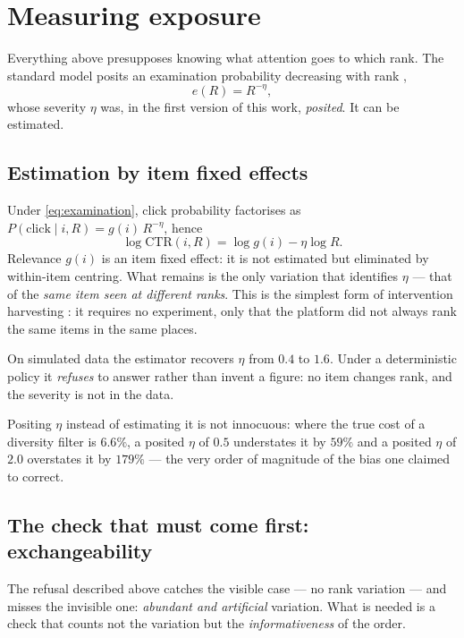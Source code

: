 \documentclass[11pt,a4paper]{article}
\begin{document}
\section{Measuring exposure}
\label{sec:exposure}

Everything above presupposes knowing what attention goes to which rank. The standard model
posits an examination probability decreasing with rank \citep{joachims2017},
\begin{equation}
e(R) = R^{-\eta},
\label{eq:examination}
\end{equation}
whose severity $\eta$ was, in the first version of this work, \emph{posited}. It can be
estimated.

\subsection{Estimation by item fixed effects}

Under \eqref{eq:examination}, click probability factorises as $P(\text{click} \mid i, R) =
g(i)\, R^{-\eta}$, hence
\begin{equation}
\log \mathrm{CTR}(i, R) = \log g(i) - \eta \log R .
\label{eq:fixedeffects}
\end{equation}
Relevance $g(i)$ is an item fixed effect: it is not estimated but eliminated by within-item
centring. What remains is the only variation that identifies $\eta$ --- that of the \emph{same
item seen at different ranks}. This is the simplest form of intervention harvesting
\citep{agarwal2019}: it requires no experiment, only that the platform did not always rank the
same items in the same places.

On simulated data the estimator recovers $\eta$ from $0.4$ to $1.6$. Under a deterministic
policy it \emph{refuses} to answer rather than invent a figure: no item changes rank, and the
severity is not in the data.

Positing $\eta$ instead of estimating it is not innocuous: where the true cost of a diversity
filter is $6.6\%$, a posited $\eta$ of $0.5$ understates it by $59\%$ and a posited $\eta$ of
$2.0$ overstates it by $179\%$ --- the very order of magnitude of the bias one claimed to
correct.

\subsection{The check that must come first: exchangeability}

The refusal described above catches the visible case --- no rank variation --- and misses the
invisible one: \emph{abundant and artificial} variation. What is needed is a check that counts
not the variation but the \emph{informativeness} of the order.
\end{document}
